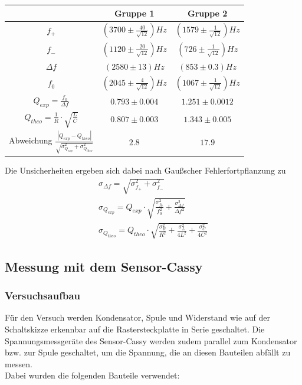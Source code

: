 \documentclass[a4paper, 11pt]{article}
\begin{document}
\begin{center}
\renewcommand{\arraystretch}{1.5}
\begin{tabular}{|c|c|c|}
\hline $ $ 			&	Gruppe 1	&	Gruppe 2 \\
\hline $f_+$ 		&	$ (3700 \pm \frac{40}{\sqrt{12}}) Hz $		&	$(1579 \pm \frac{1}{\sqrt{12}}) Hz$	\\
\hline $f_-$		&	$ (1120 \pm \frac{20}{\sqrt{12}}) Hz $		&	$(726 \pm \frac{1}{\sqrt{12}}) Hz$ \\
\hline $\Delta f$ 	&	$ (2580 \pm 13) Hz$				&	$ (853 \pm 0.3) Hz$ \\
\hline $f_0$		&	$ (2045 \pm \frac{4}{\sqrt{12}}) Hz$	&	$ (1067 \pm \frac{1}{\sqrt{12}}) Hz$ \\
\hline $Q_{exp} = \frac{f_0}{\Delta f}$						&	$ 0.793 \pm 0.004 $	&	$ 1.251 \pm 0.0012$ \\
\hline $Q_{theo} = \frac{1}{R} \cdot \sqrt{\frac{L}{C}}$	&	$ 0.807 \pm 0.003$	&	$ 1.343 \pm 0.005$ \\
\hline Abweichung $\frac{|Q_{exp} - Q_{theo}|}{\sqrt{\sigma_{Q_{exp}}^2 + \sigma_{Q_{theo}}^2}}$ & $ 2.8 $ & $ 17.9 $ \\
\hline
\end{tabular}
\end{center}

Die Unsicherheiten ergeben sich dabei nach Gaußscher Fehlerfortpflanzung zu 
\begin{eqnarray*}
\sigma_{\Delta f} = \sqrt{\sigma_{f_+}^2 + \sigma_{f_-}^2} \\
\sigma_{Q_{exp}} = Q_{exp} \cdot \sqrt{\frac{\sigma_{f_0}^2}{f_0^2} + \frac{\sigma_{\Delta f}^2}{\Delta f^2}} \\
\sigma_{Q_{theo}} = Q_{theo} \cdot \sqrt{\frac{\sigma_R^2}{R^2} + \frac{\sigma_L^2}{4L^2} + \frac{\sigma_C^2}{4C^2}}
\end{eqnarray*}



\subsection{Messung mit dem Sensor-Cassy}
\subsubsection{Versuchsaufbau}
Für den Versuch werden Kondensator, Spule und Widerstand wie auf der Schaltskizze erkennbar auf die Rastersteckplatte in Serie geschaltet. Die Spannungsmessgeräte des Sensor-Cassy werden zudem parallel zum Kondensator bzw. zur Spule geschaltet, um die Spannung, die an diesen Bauteilen abfällt zu messen. \\
Dabei wurden die folgenden Bauteile verwendet:
\end{document}
